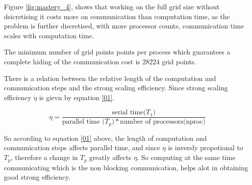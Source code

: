 \documentclass[12pt,a4paper]{article}
\begin{document}
\begin{enumerate}
		Figure \ref{fig:mastery_4}, shows that working on the full grid size without dsicretising it costs more on communication than computation time, as the problem is further discretised, with more processor counts, communication time scales with computation time.
		
		The  minimum number of grid points points per process which guarantees a complete hiding of the communication cost is $28224$ grid points.
		
		 There is a relation between the relative length of the computation and communication steps and the strong scaling efficiency. Since strong scaling efficiency $\eta$ is gievn by equation \eqref{01}.
		 
		 \begin{equation}
		 	\eta = \frac{\text{serial time($T_1$)}}{\text{parallel time ($T_p$)} * \text{number of processors(nproc)}}
		 	\label{01}
		 \end{equation}
		 
		 So according to equation \eqref{01} above, the length of computation and communication steps affects parallel time, and since $\eta$ is inversly propotional to $T_p$, therefore a change in $T_p$ greatly affects $\eta$. So computing at the same time communicating which is the non blocking communication, helps alot in obtaining good strong efficiency.
		
		 
		 
		
		
	\end{enumerate}
	
\end{document}
